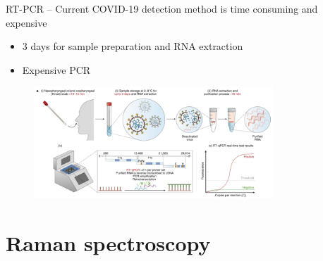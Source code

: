 \begin{frame}{RT-PCR – Current COVID-19 detection method is time consuming and expensive}

\begin{itemize}
   \item 3 days for sample preparation and RNA extraction
	\item Expensive PCR
\end{itemize}

	\begin{figure}
		
		\includegraphics[width=9.0cm]{figures/raman_covid_RT_PCR.png}
	\end{figure}


\end{frame}

\section{Raman spectroscopy} %

